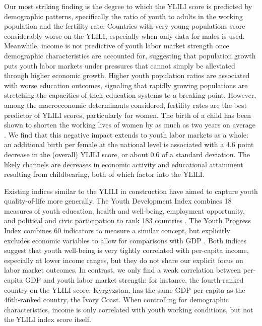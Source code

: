 \documentclass[
  a4paper, twoside, 12pt]{book}
\begin{document}
Our most striking finding is the degree to which the YLILI score is predicted by demographic patterns, specifically the ratio of youth to adults in the working population and the fertility rate. Countries with very young populations score considerably worse on the YLILI, especially when only data for males is used. Meanwhile, income is not predictive of youth labor market strength once demographic characteristics are accounted for, suggesting that population growth puts youth labor markets under pressures that cannot simply be alleviated through higher economic growth. Higher youth population ratios are associated with worse education outcomes, signaling that rapidly growing populations are stretching the capacities of their education systems to a breaking point. However, among the macroeconomic determinants considered, fertility rates are the best predictor of YLILI scores, particularly for women. The birth of a child has been shown to shorten the working lives of women by as much as two years on average \autocite{bloom2009}. We find that this negative impact extends to youth labor markets as a whole: an additional birth per female at the national level is associated with a 4.6 point decrease in the (overall) YLILI score, or about 0.6 of a standard deviation. The likely channels are decreases in economic activity and educational attainment resulting from childbearing, both of which factor into the YLILI.

Existing indices similar to the YLILI in construction have aimed to capture youth quality-of-life more generally. The Youth Development Index combines 18 measures of youth education, health and well-being, employment opportunity, and political and civic participation to rank 183 countries \autocite{sen2016}. The Youth Progress Index combines 60 indicators to measure a similar concept, but explicitly excludes economic variables to allow for comparisons with GDP \autocite{lisney2018}. Both indices suggest that youth well-being is very tightly correlated with per-capita income, especially at lower income ranges, but they do not share our explicit focus on labor market outcomes. In contrast, we only find a weak correlation between per-capita GDP and youth labor market strength: for instance, the fourth-ranked country on the YLILI score, Kyrgyzstan, has the same GDP per capita as the 46th-ranked country, the Ivory Coast. When controlling for demographic characteristics, income is only correlated with youth working conditions, but not the YLILI index score itself.
\end{document}
